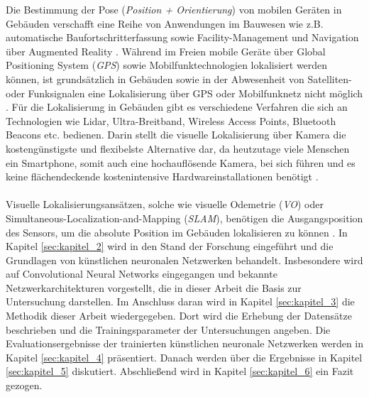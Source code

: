 Die Bestimmung der Pose (\textit{Position + Orientierung}) von mobilen Geräten in Gebäuden verschafft eine Reihe von Anwendungen im Bauwesen wie z.B. automatische Baufortschritterfassung sowie Facility-Management und Navigation über Augmented Reality \cite{kroppModelbasedPoseEstimation2016, kochNaturalMarkersAugmented2014}.
Während im Freien mobile Geräte über Global Positioning System (\textit{GPS}) sowie Mobilfunktechnologien lokalisiert werden können, ist grundsätzlich in Gebäuden sowie in der Abwesenheit von Satelliten- oder Funksignalen eine Lokalisierung über GPS oder Mobilfunknetz nicht möglich \cite{yassinRecentAdvancesIndoor2016}. Für die Lokalisierung in Gebäuden gibt es verschiedene Verfahren die sich an Technologien wie Lidar, Ultra-Breitband, Wireless Access Points, Bluetooth Beacons etc. bedienen. Darin stellt die visuelle Lokalisierung über Kamera die kostengünstigste und flexibelste Alternative dar, da heutzutage viele Menschen ein Smartphone, somit auch eine hochauflösende Kamera, bei sich führen und es keine flächendeckende kostenintensive Hardwareinstallationen benötigt \cite{wuImageBasedCamera2016}.
\\\\
Visuelle Lokalisierungsansätzen, solche wie 
visuelle Odemetrie (\textit{VO}) oder Simultaneous-Localization-and-Mapping (\textit{SLAM}), benötigen die Ausgangsposition des Sensors, um die absolute Position im Gebäuden lokalisieren zu können \cite{stephenseGlobalLocalizationUsing2002}.
In Kapitel \ref{sec:kapitel_2} wird in den Stand der Forschung eingeführt und die Grundlagen von künstlichen neuronalen Netzwerken behandelt. Insbesondere wird auf Convolutional Neural Networks eingegangen und bekannte Netzwerkarchitekturen vorgestellt, die in dieser Arbeit die Basis zur Untersuchung darstellen. Im Anschluss daran wird in Kapitel \ref{sec:kapitel_3} die Methodik dieser Arbeit wiedergegeben. Dort wird die Erhebung der Datensätze beschrieben und die Trainingsparameter der Untersuchungen angeben. Die Evaluationsergebnisse der trainierten künstlichen neuronale Netzwerken werden in Kapitel \ref{sec:kapitel_4} präsentiert. Danach werden über die Ergebnisse in Kapitel \ref{sec:kapitel_5} diskutiert. Abschließend wird in Kapitel \ref{sec:kapitel_6} ein Fazit gezogen. 


